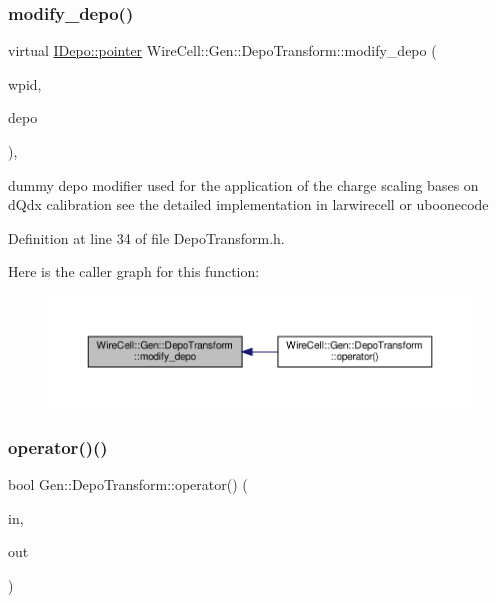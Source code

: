 \subsubsection{\texorpdfstring{modify\+\_\+depo()}{modify\_depo()}}
{\footnotesize\ttfamily virtual \hyperlink{class_wire_cell_1_1_i_data_aff870b3ae8333cf9265941eef62498bc}{I\+Depo\+::pointer} Wire\+Cell\+::\+Gen\+::\+Depo\+Transform\+::modify\+\_\+depo (\begin{DoxyParamCaption}\item[{\hyperlink{class_wire_cell_1_1_wire_plane_id}{Wire\+Plane\+Id}}]{wpid,  }\item[{\hyperlink{class_wire_cell_1_1_i_data_aff870b3ae8333cf9265941eef62498bc}{I\+Depo\+::pointer}}]{depo }\end{DoxyParamCaption})\hspace{0.3cm}{\ttfamily [inline]}, {\ttfamily [virtual]}}

dummy depo modifier used for the application of the charge scaling bases on d\+Qdx calibration see the detailed implementation in larwirecell or uboonecode 

Definition at line 34 of file Depo\+Transform.\+h.

Here is the caller graph for this function\+:
\nopagebreak
\begin{figure}[H]
\begin{center}
\leavevmode
\includegraphics[width=350pt]{class_wire_cell_1_1_gen_1_1_depo_transform_a3d401800010c7691f3f298ae730eb395_icgraph}
\end{center}
\end{figure}
\mbox{\label{class_wire_cell_1_1_gen_1_1_depo_transform_a72bd0b9e256a8e9f4311c61cf6b5692b}} 
\subsubsection{\texorpdfstring{operator()()}{operator()()}}
{\footnotesize\ttfamily bool Gen\+::\+Depo\+Transform\+::operator() (\begin{DoxyParamCaption}\item[{const \hyperlink{class_wire_cell_1_1_i_function_node_a55c0946156df9b712b8ad1a0b59b2db6}{input\+\_\+pointer} \&}]{in,  }\item[{\hyperlink{class_wire_cell_1_1_i_function_node_afc02f1ec60d31aacddf64963f9ca650b}{output\+\_\+pointer} \&}]{out }\end{DoxyParamCaption})\hspace{0.3cm}{\ttfamily [virtual]}}



